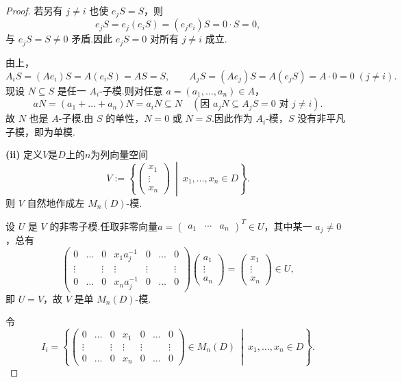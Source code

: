 \documentclass[11pt,a4paper]{article}
\theoremstyle{plain}
\theoremstyle{definition}
\begin{document}
\begin{proof}
若另有 $j \neq i$ 也使 $e_j S = S$，则
\[
e_j S = e_j(e_i S) = (e_j e_i) S = 0 \cdot S = 0,
\]
与 $e_j S = S \neq 0$ 矛盾.因此 $e_j S = 0$ 对所有 $j \neq i$ 成立.\par
\noindent{} 由上，
\[
A_i S = (A e_i) S = A(e_i S) = A S = S, \qquad
A_j S = (A e_j) S = A(e_j S) = A \cdot 0 = 0 \;(j \neq i).
\]
现设 $N \subseteq S$ 是任一 $A_i$-子模.则对任意 $a = (a_1,\dots,a_n) \in A$，
\[
a N = (a_1 + \dots + a_n) N = a_i N \subseteq N \quad (\text{因 } a_j N \subseteq A_j S = 0 \text{ 对 } j \neq i).
\]
故 $N$ 也是 $A$-子模.由 $S$ 的单性，$N = 0$ 或 $N = S$.因此作为 $A_i$-模，$S$ 没有非平凡子模，即为单模.\par
\noindent \textbf{(ii)} 定义$V$是$D$上的$n$为列向量空间
$$
V := \left\{ \begin{pmatrix} x_1 \\ \vdots \\ x_n \end{pmatrix} \ \middle| \ x_1, \dots, x_n \in D \right\}.
$$
则 $V$ 自然地作成左 $M_n(D)$-模.\par
\noindent{} 设 $U$ 是 $V$ 的非零子模.任取非零向量$a = \begin{pmatrix} a_1 & \cdots & a_n \end{pmatrix}^T \in U$，其中某一 $a_j \neq 0$，总有
$$
\begin{pmatrix}
0 & \dots & 0 & x_1 a_j^{-1} & 0 & \dots & 0 \\
\vdots & & \vdots & \vdots & \vdots & & \vdots \\
0 & \dots & 0 & x_n a_j^{-1} & 0 & \dots & 0
\end{pmatrix}
\begin{pmatrix} a_1 \\ \vdots \\ a_n \end{pmatrix}
= \begin{pmatrix} x_1 \\ \vdots \\ x_n \end{pmatrix} \in U,
$$
即 $U = V$，故 $V$ 是单 $M_n(D)$-模.\par
\noindent{} 令
$$
I_i = \left\{ \begin{pmatrix}
0 & \dots & 0 & x_1 & 0 & \dots & 0 \\
\vdots & & \vdots & \vdots & \vdots & & \vdots \\
0 & \dots & 0 & x_n & 0 & \dots & 0
\end{pmatrix}
\in M_n(D) \ \middle| \ x_1, \dots, x_n \in D \right\}.
$$
\end{proof}
\end{document}
